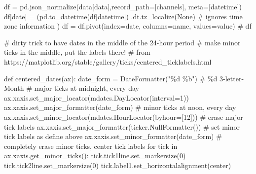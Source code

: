 \documentclass[
  letterpaper,
  DIV=11,
  numbers=noendperiod,
  oneside]{scrreprt}
\newenvironment{Shaded}{\begin{snugshade}}{\end{snugshade}}
\newcommand{\CommentTok}[1]{\textcolor[rgb]{0.37,0.37,0.37}{#1}}
\newcommand{\ControlFlowTok}[1]{\textcolor[rgb]{0.00,0.23,0.31}{#1}}
\newcommand{\DecValTok}[1]{\textcolor[rgb]{0.68,0.00,0.00}{#1}}
\newcommand{\KeywordTok}[1]{\textcolor[rgb]{0.00,0.23,0.31}{#1}}
\newcommand{\NormalTok}[1]{\textcolor[rgb]{0.00,0.23,0.31}{#1}}
\newcommand{\OperatorTok}[1]{\textcolor[rgb]{0.37,0.37,0.37}{#1}}
\newcommand{\SpecialCharTok}[1]{\textcolor[rgb]{0.37,0.37,0.37}{#1}}
\newcommand{\StringTok}[1]{\textcolor[rgb]{0.13,0.47,0.30}{#1}}
\newcommand{\VariableTok}[1]{\textcolor[rgb]{0.07,0.07,0.07}{#1}}
\begin{document}
\begin{Shaded}
\begin{Highlighting}[]
\NormalTok{df }\OperatorTok{=}\NormalTok{ pd.json\_normalize(data[}\StringTok{\textquotesingle{}data\textquotesingle{}}\NormalTok{],record\_path}\OperatorTok{=}\NormalTok{[}\StringTok{\textquotesingle{}channels\textquotesingle{}}\NormalTok{], meta}\OperatorTok{=}\NormalTok{[}\StringTok{\textquotesingle{}datetime\textquotesingle{}}\NormalTok{])}
\NormalTok{df[}\StringTok{\textquotesingle{}date\textquotesingle{}}\NormalTok{] }\OperatorTok{=}\NormalTok{ (pd.to\_datetime(df[}\StringTok{\textquotesingle{}datetime\textquotesingle{}}\NormalTok{])}
\NormalTok{                .dt.tz\_localize(}\VariableTok{None}\NormalTok{)  }\CommentTok{\# ignores time zone information}
\NormalTok{             )}
\NormalTok{df }\OperatorTok{=}\NormalTok{ df.pivot(index}\OperatorTok{=}\StringTok{\textquotesingle{}date\textquotesingle{}}\NormalTok{, columns}\OperatorTok{=}\StringTok{\textquotesingle{}name\textquotesingle{}}\NormalTok{, values}\OperatorTok{=}\StringTok{\textquotesingle{}value\textquotesingle{}}\NormalTok{)}
\CommentTok{\# df}
\end{Highlighting}
\end{Shaded}

\begin{Shaded}
\begin{Highlighting}[]
\CommentTok{\# dirty trick to have dates in the middle of the 24{-}hour period}
\CommentTok{\# make minor ticks in the middle, put the labels there!}
\CommentTok{\# from https://matplotlib.org/stable/gallery/ticks/centered\_ticklabels.html}

\KeywordTok{def}\NormalTok{ centered\_dates(ax):}
\NormalTok{    date\_form }\OperatorTok{=}\NormalTok{ DateFormatter(}\StringTok{"}\SpecialCharTok{\%d}\StringTok{ \%b"}\NormalTok{)  }\CommentTok{\# \%d 3{-}letter{-}Month}
    \CommentTok{\# major ticks at midnight, every day}
\NormalTok{    ax.xaxis.set\_major\_locator(mdates.DayLocator(interval}\OperatorTok{=}\DecValTok{1}\NormalTok{))}
\NormalTok{    ax.xaxis.set\_major\_formatter(date\_form)}
    \CommentTok{\# minor ticks at noon, every day}
\NormalTok{    ax.xaxis.set\_minor\_locator(mdates.HourLocator(byhour}\OperatorTok{=}\NormalTok{[}\DecValTok{12}\NormalTok{]))}
    \CommentTok{\# erase major tick labels}
\NormalTok{    ax.xaxis.set\_major\_formatter(ticker.NullFormatter())}
    \CommentTok{\# set minor tick labels as define above}
\NormalTok{    ax.xaxis.set\_minor\_formatter(date\_form)}
    \CommentTok{\# completely erase minor ticks, center tick labels}
    \ControlFlowTok{for}\NormalTok{ tick }\KeywordTok{in}\NormalTok{ ax.xaxis.get\_minor\_ticks():}
\NormalTok{        tick.tick1line.set\_markersize(}\DecValTok{0}\NormalTok{)}
\NormalTok{        tick.tick2line.set\_markersize(}\DecValTok{0}\NormalTok{)}
\NormalTok{        tick.label1.set\_horizontalalignment(}\StringTok{\textquotesingle{}center\textquotesingle{}}\NormalTok{)}
\end{Highlighting}
\end{Shaded}
\end{document}
